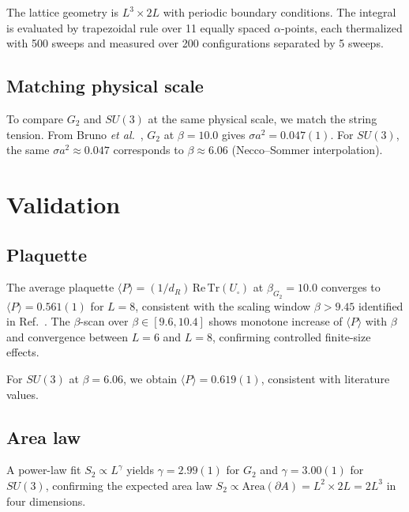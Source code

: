 \documentclass[twocolumn,prd,nofootinbib]{revtex4-2}
\begin{document}
The lattice geometry is $L^3 \times 2L$ with periodic boundary conditions. The integral is evaluated by trapezoidal rule over 11 equally spaced $\alpha$-points, each thermalized with 500 sweeps and measured over 200 configurations separated by 5 sweeps.

\subsection{Matching physical scale}

To compare $G_2$ and $SU(3)$ at the same physical scale, we match the string tension. From Bruno \emph{et al.}~\cite{Bruno2015}, $G_2$ at $\beta = 10.0$ gives $\sigma a^2 = 0.047(1)$. For $SU(3)$, the same $\sigma a^2 \approx 0.047$ corresponds to $\beta \approx 6.06$ (Necco--Sommer interpolation).

\section{Validation}

\subsection{Plaquette}

The average plaquette $\langle P \rangle = (1/d_R)\,\mathrm{Re}\,\mathrm{Tr}(U_\square)$ at $\beta_{G_2} = 10.0$ converges to $\langle P \rangle = 0.561(1)$ for $L = 8$, consistent with the scaling window $\beta > 9.45$ identified in Ref.~\cite{Bruno2015}. The $\beta$-scan over $\beta \in [9.6, 10.4]$ shows monotone increase of $\langle P \rangle$ with $\beta$ and convergence between $L = 6$ and $L = 8$, confirming controlled finite-size effects.

For $SU(3)$ at $\beta = 6.06$, we obtain $\langle P \rangle = 0.619(1)$, consistent with literature values.

\subsection{Area law}

A power-law fit $S_2 \propto L^\gamma$ yields $\gamma = 2.99(1)$ for $G_2$ and $\gamma = 3.00(1)$ for $SU(3)$, confirming the expected area law $S_2 \propto \mathrm{Area}(\partial A) = L^2 \times 2L = 2L^3$ in four dimensions.

\end{document}
